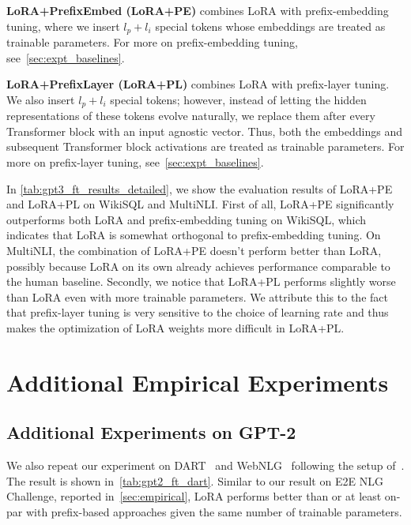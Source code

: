 \documentclass{article} %
\begin{document}
\textbf{LoRA+PrefixEmbed (LoRA+PE)} combines LoRA with prefix-embedding tuning, where we insert $l_p+l_i$ special tokens whose embeddings are treated as trainable parameters.
For more on prefix-embedding tuning, see~\autoref{sec:expt_baselines}.

\textbf{LoRA+PrefixLayer (LoRA+PL)} combines LoRA with prefix-layer tuning.
We also insert $l_p+l_i$ special tokens; however, instead of letting the hidden representations of these tokens evolve naturally, we replace them after every Transformer block with an input agnostic vector.
Thus, both the embeddings and subsequent Transformer block activations are treated as trainable parameters.
For more on prefix-layer tuning, see~\autoref{sec:expt_baselines}.

In \autoref{tab:gpt3_ft_results_detailed}, we show the evaluation results of LoRA+PE and LoRA+PL on WikiSQL and MultiNLI.
First of all, LoRA+PE significantly outperforms both LoRA and prefix-embedding tuning on WikiSQL, which indicates that LoRA is somewhat orthogonal to prefix-embedding tuning.
On MultiNLI, the combination of LoRA+PE doesn't perform better than LoRA, possibly because LoRA on its own  already achieves performance comparable to the human baseline.
Secondly, we notice that LoRA+PL performs slightly worse than LoRA even with more trainable parameters.
We attribute this to the fact that prefix-layer tuning is very sensitive to the choice of learning rate and thus makes the optimization of LoRA weights more difficult in LoRA+PL.





\section{Additional Empirical Experiments}
\label{app:extra_expt}

\subsection{Additional Experiments on GPT-2}
\label{app:gpt2_extra}

We also repeat our experiment on DART~\citep{nan2020dart} and WebNLG~\citep{gardent2017webnlg} following the setup of~\cite{li_prefix-tuning_2021}.
The result is shown in~\autoref{tab:gpt2_ft_dart}.
Similar to our result on E2E NLG Challenge, reported in~\autoref{sec:empirical}, LoRA performs better than or at least on-par with prefix-based approaches given the same number of trainable parameters.
\end{document}
